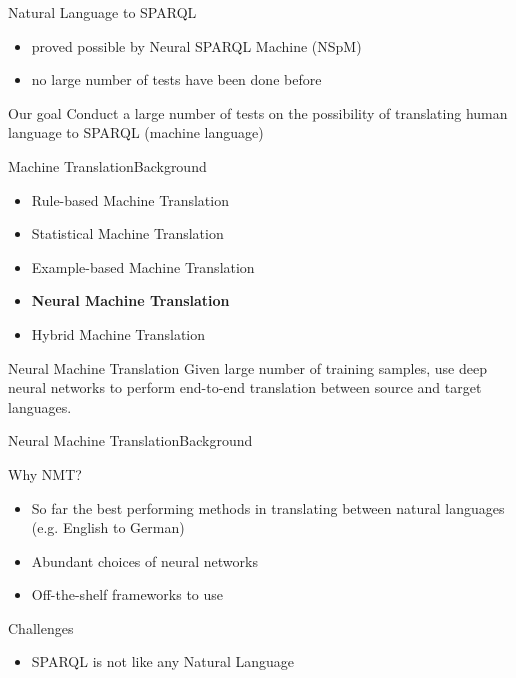 \documentclass[11pt]{beamer}
\begin{document}
\begin{frame}{Natural Language to SPARQL}
    \begin{itemize}
        \item proved possible by Neural SPARQL Machine (NSpM) \cite{Soru2018a}
        \item no large number of tests have been done before
    \end{itemize}

    \begin{block}{Our goal}
        Conduct a large number of tests on the possibility of translating human language to SPARQL (machine language)
    \end{block}
\end{frame}

\begin{frame}{Machine Translation}{Background}

    \begin{itemize}
        \item Rule-based Machine Translation
        \item Statistical Machine Translation
        \item Example-based Machine Translation
        \item \textbf{Neural Machine Translation}
        \item Hybrid Machine Translation
    \end{itemize}

    \begin{block}{Neural Machine Translation}
        Given large number of training samples, use deep neural networks to perform end-to-end translation between source and target languages.
    \end{block}
\end{frame}

\begin{frame}{Neural Machine Translation}{Background}
    
    \begin{block}{Why NMT?}
        \begin{itemize}
            \item So far \alert{the best performing} methods in translating between natural languages (e.g. English to German)
            \item Abundant choices of neural networks
            \item Off-the-shelf frameworks to use
        \end{itemize}
    \end{block}
    
    \begin{block}{Challenges}
        \begin{itemize}
            \item SPARQL is not like any Natural Language
        \end{itemize}
    \end{block}

\end{frame}
\end{document}
